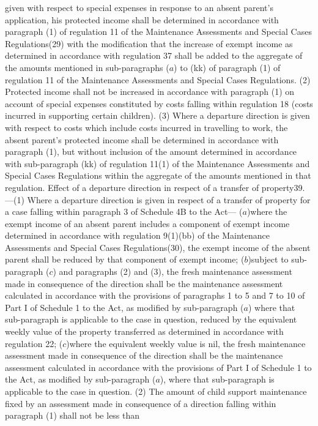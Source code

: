 \documentclass[a4paper]{article}
\begin{document}
given with respect to special expenses in response to an absent parent’s
application, his protected income shall be determined in accordance with
paragraph (1) of regulation 11 of the Maintenance Assessments and Special Cases
Regulations(29) with the modification that the increase of exempt income as
determined in accordance with regulation 37 shall be added to the aggregate of
the amounts mentioned in sub-paragraphs ($a$) to (kk) of paragraph (1) of
regulation 11 of the Maintenance Assessments and Special Cases Regulations.
(2) Protected income shall not be increased in accordance with paragraph (1) on
account of special expenses constituted by costs falling within regulation 18
(costs incurred in supporting certain children).
(3) Where a departure direction is given with respect to costs which include
costs incurred in travelling to work, the absent parent’s protected income shall
be determined in accordance with paragraph (1), but without inclusion of the
amount determined in accordance with sub-paragraph (kk) of regulation 11(1) of
the Maintenance Assessments and Special Cases Regulations within the aggregate
of the amounts mentioned in that regulation.
Effect of a departure direction in respect of a transfer of property39.—(1)
Where a departure direction is given in respect of a transfer of property for a
case falling within paragraph 3 of Schedule 4B to the Act—
($a$)where the exempt income of an absent parent includes a component of exempt
income determined in accordance with regulation 9(1)(bb) of the Maintenance
Assessments and Special Cases Regulations(30), the exempt income of the absent
parent shall be reduced by that component of exempt income;
($b$)subject to sub-paragraph ($c$) and paragraphs (2) and (3), the fresh
maintenance assessment made in consequence of the direction shall be the
maintenance assessment calculated in accordance with the provisions of
paragraphs 1 to 5 and 7 to 10 of Part I of Schedule 1 to the Act, as modified by
sub-paragraph ($a$) where that sub-paragraph is applicable to the case in
question, reduced by the equivalent weekly value of the property transferred as
determined in accordance with regulation 22;
($c$)where the equivalent weekly value is nil, the fresh maintenance assessment
made in consequence of the direction shall be the maintenance assessment
calculated in accordance with the provisions of Part I of Schedule 1 to the Act,
as modified by sub-paragraph ($a$), where that sub-paragraph is applicable to the
case in question.
(2) The amount of child support maintenance fixed by an assessment made in
consequence of a direction falling within paragraph (1) shall not be less than
\end{document}
